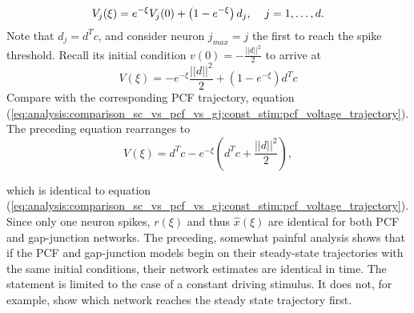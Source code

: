 \begin{enumerate}
$$
	V_j(\xi)
	=
	 e^{-\xi} V_j(0)
	+
	\left(
		1 - e^{-\xi}
	\right)
	d_j , \hspace{4mm} j = 1, \ldots, d.
$$
Note that $d_j = d^T c$, and consider neuron $j_{max} = j$ the first to reach the spike threshold. Recall its initial condition $v(0) = -\frac{||d||^2}{2}$ to arrive at
$$
	V(\xi)
	=
	 - e^{-\xi} \frac{||d||^2}{2}
	+
	\left(
		1 - e^{-\xi}
	\right)
	d^T c
$$
Compare with the corresponding PCF trajectory, equation (\ref{eq:analysis:comparison_sc_vs_pcf_vs_gj:const_stim:pcf_voltage_trajectory}). The preceding equation rearranges to
$$
	V(\xi) = 
	d^T c 
	- e^{-\xi}
	\left(
		d^T c  + \frac{||d||^2}{2}
	\right),
$$

which is identical to equation (\ref{eq:analysis:comparison_sc_vs_pcf_vs_gj:const_stim:pcf_voltage_trajectory}). Since only one neuron spikes, $r(\xi)$ and thus $\hat{x}(\xi)$ are identical for both PCF and gap-junction networks. 
The preceding, somewhat painful analysis shows that if the PCF and gap-junction models begin on their steady-state trajectories with the same initial conditions, their network estimates are identical in time. The statement is limited to the case of a constant driving stimulus. It does not, for example, show which network reaches the steady state trajectory first.




\end{enumerate}